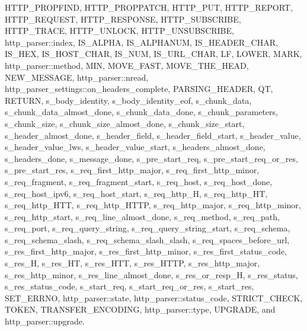 H\+T\+T\+P\+\_\+\+P\+R\+O\+P\+F\+I\+ND, H\+T\+T\+P\+\_\+\+P\+R\+O\+P\+P\+A\+T\+CH, H\+T\+T\+P\+\_\+\+P\+UT, H\+T\+T\+P\+\_\+\+R\+E\+P\+O\+RT, H\+T\+T\+P\+\_\+\+R\+E\+Q\+U\+E\+ST, H\+T\+T\+P\+\_\+\+R\+E\+S\+P\+O\+N\+SE, H\+T\+T\+P\+\_\+\+S\+U\+B\+S\+C\+R\+I\+BE, H\+T\+T\+P\+\_\+\+T\+R\+A\+CE, H\+T\+T\+P\+\_\+\+U\+N\+L\+O\+CK, H\+T\+T\+P\+\_\+\+U\+N\+S\+U\+B\+S\+C\+R\+I\+BE, http\+\_\+parser\+::index, I\+S\+\_\+\+A\+L\+P\+HA, I\+S\+\_\+\+A\+L\+P\+H\+A\+N\+UM, I\+S\+\_\+\+H\+E\+A\+D\+E\+R\+\_\+\+C\+H\+AR, I\+S\+\_\+\+H\+EX, I\+S\+\_\+\+H\+O\+S\+T\+\_\+\+C\+H\+AR, I\+S\+\_\+\+N\+UM, I\+S\+\_\+\+U\+R\+L\+\_\+\+C\+H\+AR, LF, L\+O\+W\+ER, M\+A\+RK, http\+\_\+parser\+::method, M\+IN, M\+O\+V\+E\+\_\+\+F\+A\+ST, M\+O\+V\+E\+\_\+\+T\+H\+E\+\_\+\+H\+E\+AD, N\+E\+W\+\_\+\+M\+E\+S\+S\+A\+GE, http\+\_\+parser\+::nread, http\+\_\+parser\+\_\+settings\+::on\+\_\+headers\+\_\+complete, P\+A\+R\+S\+I\+N\+G\+\_\+\+H\+E\+A\+D\+ER, QT, R\+E\+T\+U\+RN, s\+\_\+body\+\_\+identity, s\+\_\+body\+\_\+identity\+\_\+eof, s\+\_\+chunk\+\_\+data, s\+\_\+chunk\+\_\+data\+\_\+almost\+\_\+done, s\+\_\+chunk\+\_\+data\+\_\+done, s\+\_\+chunk\+\_\+parameters, s\+\_\+chunk\+\_\+size, s\+\_\+chunk\+\_\+size\+\_\+almost\+\_\+done, s\+\_\+chunk\+\_\+size\+\_\+start, s\+\_\+header\+\_\+almost\+\_\+done, s\+\_\+header\+\_\+field, s\+\_\+header\+\_\+field\+\_\+start, s\+\_\+header\+\_\+value, s\+\_\+header\+\_\+value\+\_\+lws, s\+\_\+header\+\_\+value\+\_\+start, s\+\_\+headers\+\_\+almost\+\_\+done, s\+\_\+headers\+\_\+done, s\+\_\+message\+\_\+done, s\+\_\+pre\+\_\+start\+\_\+req, s\+\_\+pre\+\_\+start\+\_\+req\+\_\+or\+\_\+res, s\+\_\+pre\+\_\+start\+\_\+res, s\+\_\+req\+\_\+first\+\_\+http\+\_\+major, s\+\_\+req\+\_\+first\+\_\+http\+\_\+minor, s\+\_\+req\+\_\+fragment, s\+\_\+req\+\_\+fragment\+\_\+start, s\+\_\+req\+\_\+host, s\+\_\+req\+\_\+host\+\_\+done, s\+\_\+req\+\_\+host\+\_\+ipv6, s\+\_\+req\+\_\+host\+\_\+start, s\+\_\+req\+\_\+http\+\_\+H, s\+\_\+req\+\_\+http\+\_\+\+HT, s\+\_\+req\+\_\+http\+\_\+\+H\+TT, s\+\_\+req\+\_\+http\+\_\+\+H\+T\+TP, s\+\_\+req\+\_\+http\+\_\+major, s\+\_\+req\+\_\+http\+\_\+minor, s\+\_\+req\+\_\+http\+\_\+start, s\+\_\+req\+\_\+line\+\_\+almost\+\_\+done, s\+\_\+req\+\_\+method, s\+\_\+req\+\_\+path, s\+\_\+req\+\_\+port, s\+\_\+req\+\_\+query\+\_\+string, s\+\_\+req\+\_\+query\+\_\+string\+\_\+start, s\+\_\+req\+\_\+schema, s\+\_\+req\+\_\+schema\+\_\+slash, s\+\_\+req\+\_\+schema\+\_\+slash\+\_\+slash, s\+\_\+req\+\_\+spaces\+\_\+before\+\_\+url, s\+\_\+res\+\_\+first\+\_\+http\+\_\+major, s\+\_\+res\+\_\+first\+\_\+http\+\_\+minor, s\+\_\+res\+\_\+first\+\_\+status\+\_\+code, s\+\_\+res\+\_\+H, s\+\_\+res\+\_\+\+HT, s\+\_\+res\+\_\+\+H\+TT, s\+\_\+res\+\_\+\+H\+T\+TP, s\+\_\+res\+\_\+http\+\_\+major, s\+\_\+res\+\_\+http\+\_\+minor, s\+\_\+res\+\_\+line\+\_\+almost\+\_\+done, s\+\_\+res\+\_\+or\+\_\+resp\+\_\+H, s\+\_\+res\+\_\+status, s\+\_\+res\+\_\+status\+\_\+code, s\+\_\+start\+\_\+req, s\+\_\+start\+\_\+req\+\_\+or\+\_\+res, s\+\_\+start\+\_\+res, S\+E\+T\+\_\+\+E\+R\+R\+NO, http\+\_\+parser\+::state, http\+\_\+parser\+::status\+\_\+code, S\+T\+R\+I\+C\+T\+\_\+\+C\+H\+E\+CK, T\+O\+K\+EN, T\+R\+A\+N\+S\+F\+E\+R\+\_\+\+E\+N\+C\+O\+D\+I\+NG, http\+\_\+parser\+::type, U\+P\+G\+R\+A\+DE, and http\+\_\+parser\+::upgrade.


